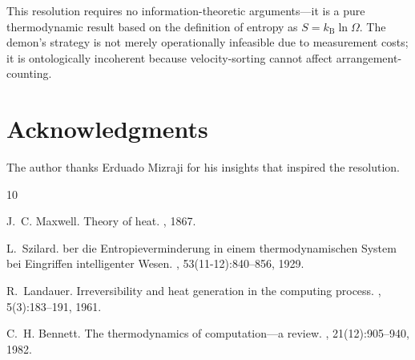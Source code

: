 \documentclass[10pt,twocolumn,letterpaper]{article}
\theoremstyle{definition}
\theoremstyle{remark}
\newcommand{\kb}{k_\text{B}}
\newcommand{\Om}{\Omega}
\begin{document}
This resolution requires no information-theoretic arguments—it is a pure thermodynamic result based on the definition of entropy as $S = \kb \ln \Om$. The demon's strategy is not merely operationally infeasible due to measurement costs; it is ontologically incoherent because velocity-sorting cannot affect arrangement-counting.

\section*{Acknowledgments}

The author thanks Erduado Mizraji for his insights that inspired the resolution.


\begin{thebibliography}{10}

J.~C. Maxwell.
\newblock Theory of heat.
, 1867.

L.~Szilard.
ber die Entropieverminderung in einem thermodynamischen System bei Eingriffen intelligenter Wesen.
, 53(11-12):840--856, 1929.

R.~Landauer.
\newblock Irreversibility and heat generation in the computing process.
, 5(3):183--191, 1961.

C.~H. Bennett.
\newblock The thermodynamics of computation—a review.
, 21(12):905--940, 1982.

\end{thebibliography}
\end{document}

